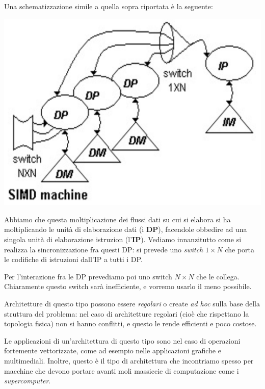 \documentclass[a4paper,11pt]{article}
\begin{document}
\newpage

Una schematizzazione simile a quella sopra riportata è la seguente:
\begin{center}
	\includegraphics[scale=0.2]{../figures/simd_flynn.png}
\end{center}

Abbiamo che questa moltiplicazione dei flussi dati su cui si elabora si ha moltiplicando le unità di elaborazione dati (i \textbf{DP}), facendole obbedire ad una singola unità di elaborazione istruzion (l'\textbf{IP}).
Vediamo innanzitutto come si realizza la sincronizzazione fra questi DP: si prevede uno \textit{switch} $1\times N$ che porta le codifiche di istruzioni dall'IP a tutti i DP.

Per l'interazione fra le DP prevediamo poi uno switch $N \times N$ che le collega. Chiaramente questo switch sarà inefficiente, e vorremo usarlo il meno possibile.

Architetture di questo tipo possono essere \textit{regolari} o create \textit{ad hoc} sulla base della struttura del problema: nel caso di architetture regolari (cioè che rispettano la topologia fisica) non si hanno conflitti, e questo le rende efficienti e poco costose.

Le applicazioni di un'architettura di questo tipo sono nel caso di operazioni fortemente vettorizzate, come ad esempio nelle applicazioni grafiche e multimediali.
Inoltre, questo è il tipo di architettura che incontriamo spesso per macchine che devono portare avanti moli massiccie di computazione come i \textit{supercomputer}.

\par\smallskip
\end{document}
